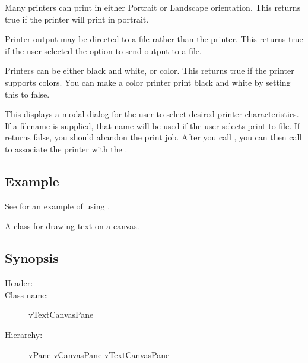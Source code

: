 Many printers can print in either Portrait or Landscape orientation.
This returns true if the printer will print in portrait.



Printer output may be directed to a file rather than the printer.
This returns true if the user selected the option to send output
to a file.



Printers can be either black and white, or color. This
returns true if the printer supports colors. You can
make a color printer print black and white by setting
this to false.


This displays a modal dialog for the user to select desired
printer characteristics. If a filename is supplied, that
name will be used if the user selects print to file.
If  returns false, you should abandon the
print job. After you call , you can then
call  to associate the printer
with the .

\subsection* {Example}

See  for an example of using .


A class for drawing text on a canvas. 

\subsection* {Synopsis}

\begin{description}
	\item [Header:] 
	\item [Class name:] vTextCanvasPane
 	\item [Hierarchy:] vPane \rta vCanvasPane \rta vTextCanvasPane
\end{description}

